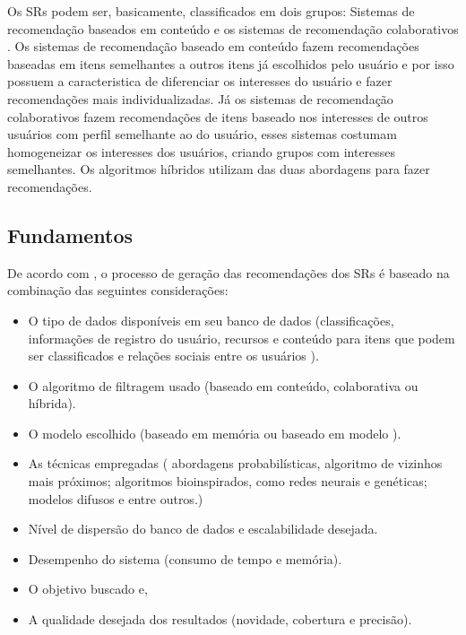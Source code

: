 Os SRs podem ser, basicamente, classificados em dois grupos: Sistemas de recomendação baseados	
em conteúdo e os sistemas de recomendação colaborativos \cite{mauricio}. Os sistemas
de recomendação baseado em conteúdo fazem recomendações baseadas em itens semelhantes
a outros itens já escolhidos pelo usuário e por isso possuem a caracteristica de
diferenciar os interesses do usuário e fazer recomendações mais individualizadas. Já os 
sistemas de recomendação colaborativos fazem recomendações de itens baseado nos interesses 
de outros usuários com perfil semelhante ao do usuário, esses sistemas costumam homogeneizar
os interesses dos usuários, criando grupos com interesses semelhantes. Os algoritmos híbridos 
utilizam das duas abordagens para fazer recomendações.




\subsection{Fundamentos}

De acordo com , o processo de geração das recomendações dos SRs é baseado 
na combinação das seguintes considerações:


\begin{itemize}

	\item O tipo de dados disponíveis em seu banco de dados (classificações, informações de registro do usuário, recursos e conteúdo para itens que podem ser
	classificados e relações sociais entre os usuários ).

	\item O algoritmo de filtragem usado (baseado em conteúdo, colaborativa ou híbrida).

	\item O modelo escolhido (baseado em memória ou baseado em modelo ).
	
	\item As técnicas empregadas ( abordagens probabilísticas, algoritmo de vizinhos mais próximos;
	algoritmos bioinspirados, como redes neurais e genéticas; modelos difusos e entre outros.)
	
	\item  Nível de dispersão do banco de dados e escalabilidade desejada.

	\item  Desempenho do sistema (consumo de tempo e memória).

	\item  O objetivo buscado e,

	\item A qualidade desejada dos resultados (novidade, cobertura e
   precisão).

\end{itemize}

